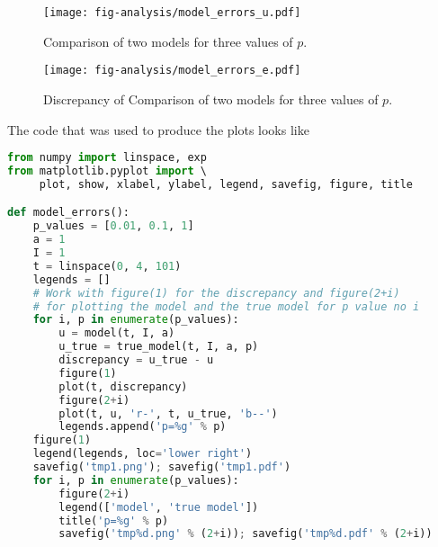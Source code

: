 \documentclass[graybox,sectrefs,envcountresetchap,open=right,final]{svmonodo}
\begin{document}
\begin{figure}[!ht]  %
  \centerline{\texttt{[image: fig-analysis/model\_errors\_u.pdf]}}
  \caption{
  Comparison of two models for three values of $p$. \label{decay:analysis:model_errors:fig:model_u}
  }
\end{figure}

\begin{figure}[!ht]  %
  \centerline{\texttt{[image: fig-analysis/model\_errors\_e.pdf]}}
  \caption{
  Discrepancy of Comparison of two models for three values of $p$. \label{decay:analysis:model_errors:fig:model_e}
  }
\end{figure}

The code that was used to produce the plots looks like































\begin{lstlisting}[language=python,style=blue1_bluegreen]
from numpy import linspace, exp
from matplotlib.pyplot import \ 
     plot, show, xlabel, ylabel, legend, savefig, figure, title

def model_errors():
    p_values = [0.01, 0.1, 1]
    a = 1
    I = 1
    t = linspace(0, 4, 101)
    legends = []
    # Work with figure(1) for the discrepancy and figure(2+i)
    # for plotting the model and the true model for p value no i
    for i, p in enumerate(p_values):
        u = model(t, I, a)
        u_true = true_model(t, I, a, p)
        discrepancy = u_true - u
        figure(1)
        plot(t, discrepancy)
        figure(2+i)
        plot(t, u, 'r-', t, u_true, 'b--')
        legends.append('p=%g' % p)
    figure(1)
    legend(legends, loc='lower right')
    savefig('tmp1.png'); savefig('tmp1.pdf')
    for i, p in enumerate(p_values):
        figure(2+i)
        legend(['model', 'true model'])
        title('p=%g' % p)
        savefig('tmp%d.png' % (2+i)); savefig('tmp%d.pdf' % (2+i))

\end{lstlisting}
\end{document}
